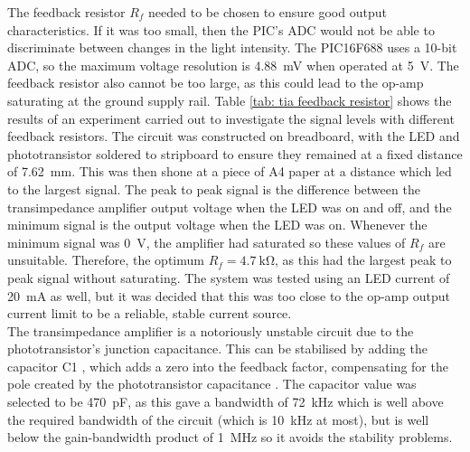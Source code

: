 The feedback resistor $R_f$ needed to be chosen to ensure good output characteristics. If it was too small, then the PIC's ADC would not be able to discriminate between changes in the light intensity.  The PIC16F688 uses a 10-bit ADC, so the maximum voltage resolution is \SI{4.88}{\milli\volt} when operated at \SI{5}{\volt}. The feedback resistor also cannot be too large, as this could lead to the op-amp saturating at the ground supply rail. Table \ref{tab: tia feedback resistor} shows the results of an experiment carried out to investigate the signal levels with different feedback resistors. The circuit was constructed on breadboard, with the LED and phototransistor soldered to stripboard to ensure they remained at a fixed distance of \SI{7.62}{\milli\metre}. This was then shone at a piece of A4 paper at a distance which led to the largest signal. The peak to peak signal is the difference between the transimpedance amplifier output voltage when the LED was on and off, and the minimum signal is the output voltage when the LED was on. Whenever the minimum signal was \SI{0}{\volt}, the amplifier had saturated so these values of $R_f$ are unsuitable. Therefore, the optimum $R_f = \SI{4.7}{\kilo\ohm}$, as this had the largest peak to peak signal without saturating. The system was tested using an LED current of \SI{20}{\milli\ampere} as well, but it was decided that this was too close to the op-amp output current limit to be a reliable, stable current source.\\


The transimpedance amplifier is a notoriously unstable circuit due to the phototransistor's junction capacitance. This can be stabilised by adding the capacitor C1 \cite{tia_stability}, which adds a zero into the feedback factor, compensating for the pole created by the phototransistor capacitance \cite{tia_stability}. The capacitor value was selected to be \SI{470}{\pico\farad}, as this gave a bandwidth of \SI{72}{\kilo\hertz} which is well above the required bandwidth of the circuit (which is \SI{10}{\kilo\hertz} at most), but is well below the gain-bandwidth product of \SI{1}{\mega\hertz} so it avoids the stability problems.\\

